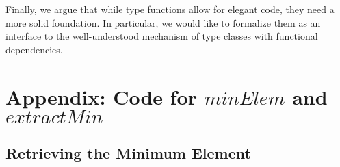 \documentclass[10pt]{article}
\newcommand{\Varid}[1]{\mathit{#1}}
\begin{document}
Finally, we argue that while
  type functions allow for elegant code, they need a more solid foundation.
  In particular, we would like to formalize them as an interface to the 
  well-understood mechanism of type classes with functional dependencies.

%


\section{Appendix: Code for \ensuremath{\Varid{minElem}} and \ensuremath{\Varid{extractMin}}}

\subsection{Retrieving the Minimum Element} 
\end{document}
